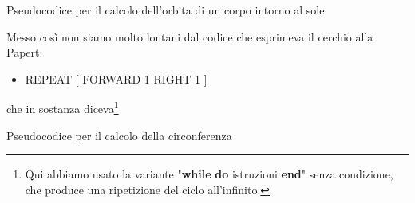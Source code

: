 \vskip 1cm

\begin{algorithm}[H]
 \caption{Pseudocodice per il calcolo dell'orbita di un corpo intorno al sole}
\end{algorithm}

\vskip 1cm

Messo così non siamo molto lontani dal codice che esprimeva il cerchio alla Papert:

\vskip 1cm

\begin{minipage}{1.0\textwidth}
\begin{itemize}[itemsep=-3pt,parsep=2pt]
\item[] \hspace{8pt}REPEAT [ FORWARD 1 RIGHT 1 ]   
\end{itemize}          	          
\end{minipage}

\vskip 1cm

che in sostanza diceva\footnote{Qui abbiamo usato la variante "\textbf{while} \textbf{do} istruzioni \textbf{end}" senza condizione, che produce una ripetizione del ciclo all'infinito.}

\vskip 1cm

\begin{algorithm}[H]
 \caption{Pseudocodice per il calcolo della circonferenza}
\end{algorithm}

\vskip 1cm

